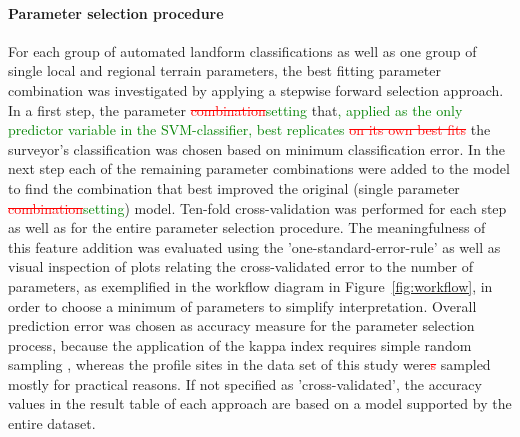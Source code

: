 \documentclass[preprint,12pt,authoryear]{elsarticle}
\begin{document}
\paragraph{Parameter selection procedure} For each group of automated landform classifications as well as one group of single local and regional terrain parameters, the best fitting parameter combination was investigated by applying a stepwise forward selection approach. In a first step, the parameter \textcolor{red}{\sout{combination}}\textcolor{green}{setting} that\textcolor{green}{, applied as the only predictor variable in the SVM-classifier, best replicates} \textcolor{red}{\sout{on its own best fits}} the surveyor's classification was chosen based on minimum classification error. In the next step each of the remaining parameter combinations were added to the model to find the combination that best improved the original (single parameter \textcolor{red}{\sout{combination}}\textcolor{green}{setting}) model. Ten-fold cross-validation was performed for each step as well as for the entire parameter selection procedure. The meaningfulness of this feature addition was evaluated using the 'one-standard-error-rule' \citep{James2013} as well as visual inspection of plots relating the cross-validated error to the number of parameters, as exemplified in the workflow diagram in Figure~\ref{fig:workflow}, in order to choose a minimum of parameters to simplify interpretation. Overall prediction error was chosen as accuracy measure for the parameter selection process, because the application of the kappa index requires simple random sampling \citep{Congalton1991}, whereas the profile sites in the data set of this study were\textcolor{red}{\sout{s}} sampled mostly for practical reasons. If not specified as 'cross-validated', the accuracy values in the result table of each approach are based on a model supported by the entire dataset. 
\end{document}

